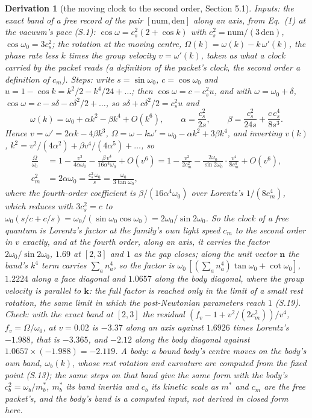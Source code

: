 \documentclass[pdflatex,sn-mathphys-num]{sn-jnl}
\newcommand{\num}{\mathrm{num}}
\newcommand{\den}{\mathrm{den}}
\theoremstyle{thmstyleone}
\newtheorem{derivation}{Derivation}
\begin{document}
\begin{derivation}[the moving clock to the second order, Section 5.1]
\emph{Inputs:} the exact band of a free record of the pair $[\num, \den]$ along an axis, from Eq.~(1) at the vacuum's pace (S.1): $\cos\omega = c_s^2(2 + \cos k)$ with $c_s^2 = \num / (3\,\den)$, $\cos\omega_0 = 3c_s^2$; the rotation at the moving centre, $\Omega(k) = \omega(k) - k\,\omega'(k)$, the phase rate less $k$ times the group velocity $v = \omega'(k)$, taken as what a clock carried by the packet reads (a definition of the packet's clock, the second order a definition of $c_m$). \emph{Steps:} write $s = \sin\omega_0$, $c = \cos\omega_0$ and $u = 1 - \cos k = k^2 / 2 - k^4 / 24 + \dots$; then $\cos\omega = c - c_s^2 u$, and with $\omega = \omega_0 + \delta$, $\cos\omega = c - s\delta - c\delta^2 / 2 + \dots$, so $s\delta + c\delta^2 / 2 = c_s^2 u$ and
\[
\omega(k) = \omega_0 + \alpha k^2 - \beta k^4 + O(k^6), \qquad \alpha = \frac{c_s^2}{2s}, \qquad \beta = \frac{c_s^2}{24s} + \frac{c\,c_s^4}{8s^3}.
\]
Hence $v = \omega' = 2\alpha k - 4\beta k^3$, $\Omega = \omega - k\omega' = \omega_0 - \alpha k^2 + 3\beta k^4$, and inverting $v(k)$, $k^2 = v^2 / (4\alpha^2) + \beta v^4 / (4\alpha^5) + \dots$, so
\begin{align*}
\frac{\Omega}{\omega_0} &= 1 - \frac{v^2}{4\alpha\omega_0} - \frac{\beta\,v^4}{16\alpha^4\omega_0} + O(v^6) = 1 - \frac{v^2}{2c_m^2} - \frac{2\omega_0}{\sin 2\omega_0}\cdot\frac{v^4}{8c_m^4} + O(v^6),\\
c_m^2 &= 2\alpha\omega_0 = \frac{c_s^2\,\omega_0}{s} = \frac{\omega_0}{3\tan\omega_0},
\end{align*}
where the fourth-order coefficient is $\beta / (16\alpha^4\omega_0)$ over Lorentz's $1 / (8c_m^4)$, which reduces with $3c_s^2 = c$ to $\omega_0(s / c + c / s) = \omega_0 / (\sin\omega_0\cos\omega_0) = 2\omega_0 / \sin 2\omega_0$. So the clock of a free quantum is Lorentz's factor at the family's own light speed $c_m$ to the second order in $v$ exactly, and at the fourth order, along an axis, it carries the factor $2\omega_0 / \sin 2\omega_0$, $1.69$ at $[2, 3]$ and $1$ as the gap closes; along the unit vector $\mathbf n$ the band's $k^4$ term carries $\sum_a n_a^4$, so the factor is $\omega_0\,[(\sum_a n_a^4)\tan\omega_0 + \cot\omega_0]$, $1.2224$ along a face diagonal and $1.0657$ along the body diagonal, where the group velocity is parallel to $\mathbf k$: the full factor is reached only in the limit of a small rest rotation, the same limit in which the post-Newtonian parameters reach $1$ (S.19). \emph{Check:} with the exact band at $[2, 3]$ the residual $(f_v - 1 + v^2 / (2c_m^2)) / v^4$, $f_v = \Omega / \omega_0$, at $v = 0.02$ is $-3.37$ along an axis against $1.6926$ times Lorentz's $-1.988$, that is $-3.365$, and $-2.12$ along the body diagonal against $1.0657 \times (-1.988) = -2.119$. \emph{A body:} a bound body's centre moves on the body's own band, $\omega_b(k)$, whose rest rotation and curvature are computed from the fixed point (S.13); the same steps on that band give the same form with the body's $c_b^2 = \omega_b / m_b^*$, $m_b^*$ its band inertia and $c_b$ its kinetic scale as $m^*$ and $c_m$ are the free packet's, and the body's band is a computed input, not derived in closed form here.

\end{derivation}
\end{document}
